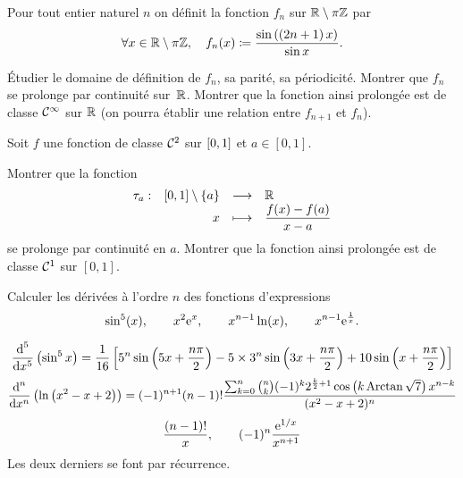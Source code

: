 \documentclass{magnolia}
\begin{document}

Pour tout entier naturel $n$ on définit la fonction $f_n$ sur
$\mathbb{R}\setminus\pi\mathbb{Z}$ par
\[\forall x\in\mathbb{R}\setminus\pi\mathbb{Z} ,\quad
  f_n(x)\coloneqq \frac{\sin\left(\left(2n+1\right)x\right)}{\sin x}.\]
\begin{questions}
\question Étudier le domaine de définition de $f_n$, sa parité, sa périodicité.
\question Montrer que $f_n$ se prolonge par continuité sur~$\mathbb{R}$. 
\question Montrer que la fonction ainsi prolongée est de classe
  $\mathcal{C}^{\infty}$ sur $\mathbb{R}$ (on pourra établir une relation entre $f_{n+1}$
  et $f_n$).
\end{questions}

Soit $f$ une fonction de classe $\mathcal{C}^{2}$ sur $\left[0,1\right]$ et
$a\in[0,1]$. 
\begin{questions}
\question Montrer que la fonction
  \[\dspappli{\tau_a}{\interf{0}{1}\setminus\ens{a}}{\R}{x}{%
    \frac{f(x)-f(a)}{x-a}}\]
  se prolonge par continuité en $a$.
\question Montrer que la fonction ainsi prolongée est de classe $\mathcal{C}^{1}$ sur
  $[0,1]$.
\end{questions}

Calculer les dérivées à l'ordre $n$ des fonctions d'expressions
\[\sin^5(x), \qquad x^2{\rm e}^x, \qquad
  x^{n-1}\ln(x), \qquad x^{n-1}{\rm e}^{\frac{1}{x}}.\]
\begin{sol}
\[\frac{\text{d}^5}{\text{d}x^5}\left(\sin^5 x\right)=
  \frac{1}{16}\left[5^n\sin\left(5x+\frac{n\pi}{2}\right)
  -5\times 3^n\sin\left(3x+\frac{n\pi}{2}\right)+10\sin\left(x+\frac{n\pi}{2}\right)\right]\]
\[\frac{\text{d}^n}{\text{d}x^n}\left(\ln\left(x^2-x+2\right)\right)=
  (-1)^{n+1}(n-1)!\frac{\sum_{k=0}^n \binom{n}{k}(-1)^k
  2^{\frac{k}{2}+1}\cos\left(k\operatorname{Arctan}\sqrt{7}\right)x^{n-k}}{(x^2-x+2)^n}\]
\[\frac{(n-1)!}{x}, \qquad (-1)^n\frac{{\rm e}^{1/x}}{x^{n+1}}\]
Les deux derniers se font par récurrence.
\end{sol}
\end{document}
